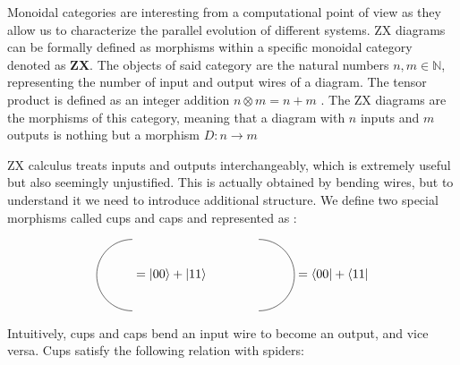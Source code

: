 \documentclass[12pt, twoside, openany]{book}
\newcommand{\catname}[1]{{\normalfont\textbf{#1}}}
\newcommand{\ZXc}{\catname{ZX}}
\begin{document}
Monoidal categories are interesting from a computational point of view as they allow us to characterize the parallel evolution of different systems. ZX diagrams can be formally defined as morphisms within a specific monoidal category denoted as \ZXc. The objects of said category are the natural numbers $n,m \in \mathbb{N}$, representing the number of input and output wires of a diagram. The tensor product is defined as an integer addition $n \otimes m = n + m$ \cite{vandewetering2020zxcalculusworkingquantumcomputer}. The ZX diagrams are the morphisms of this category, meaning that a diagram with $n$ inputs and $m$ outputs is nothing but a morphism $D:n \rightarrow m$

ZX calculus treats inputs and outputs interchangeably, which is extremely useful but also seemingly unjustified. This is actually obtained by bending wires, but to understand it we need to introduce additional structure. We define two special morphisms called cups and caps and represented as \cite{KissingerWetering2024Book}: 

\begin{equation}
\begin{tikzpicture}[baseline={([yshift=-.5ex]0,0)}]
  \draw (0,1) arc (90:270:1);
\end{tikzpicture} 
= \ket{00} + \ket{11} \qquad \qquad
\begin{tikzpicture}[baseline={([yshift=-.5ex]0,0)}]
  \draw (0,-1) arc (-90:90:1);
\end{tikzpicture} 
= \bra{00} + \bra{11}
\end{equation}

Intuitively, cups and caps bend an input wire to become an output, and vice versa. Cups satisfy the following relation with spiders:
\end{document}
